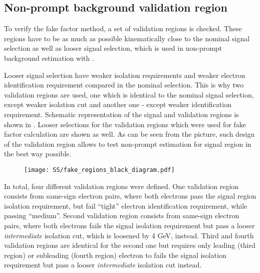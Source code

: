 \subsection{Non-prompt background validation region}
To verify the fake factor method, a set of validation regions is checked. 
These regions have to be as much as possible kinematically close to
the nominal signal selection as well as looser signal selection, 
which is used in non-prompt background estimation with .

Looser signal selection have weaker isolation requirements and weaker 
electron identification requirement compared in the nominal selection.
This is why two validation regions are used, one which is identical
to the nominal signal selection, except weaker isolation cut and another
one - except weaker identification requirement. 
Schematic representation of the signal and validation regions is shown
in . 
Looser selections for the
validation regions which were used for fake factor calculation are shown
as well. As can be seen from the picture, such design of the validation
region allows to test non-prompt estimation for signal region in the 
best way possible.

\begin{figure}[h]
\begin{center}
\texttt{[image: SS/fake\_regions\_black\_diagram.pdf]}
\caption{\toDo}
\label{fig:fake_validation_regions}
\end{center}
\end{figure}

In total, four different validation regions were defined.
One validation region consists from same-sign electron pairs, where both electrons pass the signal region isolation requirement, 
but fail ``tight'' electron identification requirement, while passing ``medium''.
Second validation region consists from same-sign electron pairs, where both electrons fails the signal isolation requirement
but pass a looser \textit{intermediate} isolation cut, which is loosened by 4 GeV, instead.
Third and fourth validation regions are identical for the second one but requires only leading (third region) or subleading (fourth region)
electron to fails the signal isolation requirement but pass a looser \textit{intermediate} isolation cut instead.

